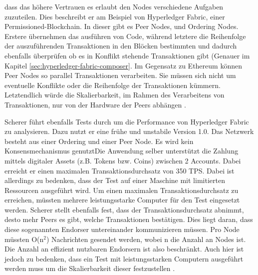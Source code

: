  dass das höhere Vertrauen es erlaubt den Nodes verschiedene Aufgaben zuzuteilen. Dies beschreibt er am Beispiel von Hyperledger Fabric, einer Permissioned-Blockchain. In dieser gibt es Peer Nodes, und Ordering Nodes. Erstere übernehmen das ausführen von Code, während letztere die Reihenfolge der auszuführenden Transaktionen in den Blöcken bestimmten und dadurch ebenfalls überprüfen ob es in Konflikt stehende Transaktionen gibt (Genauer im Kapitel \ref{sec:hyperledger-fabric-composer}. Im Gegensatz zu Ethereum können Peer Nodes so parallel Transaktionen verarbeiten. Sie müssen sich nicht um eventuelle Konflikte oder die Reihenfolge der Transaktionen kümmern. Letztendlich würde die Skalierbarkeit, im Rahmen des Verarbeitens von Transaktionen, nur von der Hardware der Peers abhängen \cite{SchererPerformanceScalabilityBlockchain2017}.

Scherer führt ebenfalls Tests durch um die Performance von Hyperledger Fabric zu analysieren. Dazu nutzt er eine frühe und unstabile Version 1.0. Das Netzwerk besteht aus einer Ordering und einer Peer Node. Es wird kein Konsensmechanismus genutztDie Anwendung selber unterstützt die Zahlung mittels digitaler Assets (z.B. Tokens bzw. Coins) zwischen 2 Accounts. Dabei erreicht er einen maximalen Transaktionsdurchsatz von 350 TPS. Dabei ist allerdings zu bedenken, dass der Test auf einer Maschine mit limitierten Ressourcen ausgeführt wird. Um einen maximalen Transaktionsdurchsatz zu erreichen, müssten mehrere leistungsstarke Computer für den Test eingesetzt werden. Scherer stellt ebenfalls fest, dass der Transaktionsdurchsatz abnimmt, desto mehr Peers es gibt, welche Transaktionen bestätigen. Dies liegt daran, dass diese sogenannten Endorser untereinander kommunizieren müssen. Pro Node müssten O(n$^2$) Nachrichten gesendet werden, wobei n die Anzahl an Nodes ist. Die Anzahl an effizient nutzbaren Endorsern ist also beschränkt. Auch hier ist jedoch zu bedenken, dass ein Test mit leistungsstarken Computern ausgeführt werden muss um die Skalierbarkeit dieser festzustellen \cite{SchererPerformanceScalabilityBlockchain2017}.

